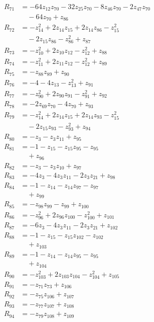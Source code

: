 \begin{align*}
R_{71} &= -64z_{12}z_{70} -32z_{25}z_{70} -8z_{46}z_{70} -2z_{47}z_{70} \\
&\quad -64z_{70} +z_{86} \\
R_{72} &= -z_{14}^{2} +2z_{14}z_{15} +2z_{14}z_{86} -z_{15}^{2} \\
&\quad -2z_{15}z_{86} -z_{86}^{2} +z_{87} \\
R_{73} &= -z_{10}^{2} +2z_{10}z_{12} -z_{12}^{2} +z_{88} \\
R_{74} &= -z_{11}^{2} +2z_{11}z_{12} -z_{12}^{2} +z_{89} \\
R_{75} &= -z_{88}z_{89} +z_{90} \\
R_{76} &= -4 -4z_{13} -z_{13}^{2} +z_{91} \\
R_{77} &= -z_{90}^{2} +2z_{90}z_{91} -z_{91}^{2} +z_{92} \\
R_{78} &= -2z_{69}z_{70} -4z_{70} +z_{93} \\
R_{79} &= -z_{14}^{2} +2z_{14}z_{15} +2z_{14}z_{93} -z_{15}^{2} \\
&\quad -2z_{15}z_{93} -z_{93}^{2} +z_{94} \\
R_{80} &= -z_{3} -z_{3}z_{11} +z_{95} \\
R_{81} &= -1 -z_{15} -z_{15}z_{95} -z_{95} \\
&\quad +z_{96} \\
R_{82} &= -z_{3} -z_{3}z_{10} +z_{97} \\
R_{83} &= -4z_{3} -4z_{3}z_{11} -2z_{3}z_{21} +z_{98} \\
R_{84} &= -1 -z_{14} -z_{14}z_{97} -z_{97} \\
&\quad +z_{99} \\
R_{85} &= -z_{98}z_{99} -z_{99} +z_{100} \\
R_{86} &= -z_{96}^{2} +2z_{96}z_{100} -z_{100}^{2} +z_{101} \\
R_{87} &= -6z_{3} -4z_{3}z_{11} -2z_{3}z_{21} +z_{102} \\
R_{88} &= -1 -z_{15} -z_{15}z_{102} -z_{102} \\
&\quad +z_{103} \\
R_{89} &= -1 -z_{14} -z_{14}z_{95} -z_{95} \\
&\quad +z_{104} \\
R_{90} &= -z_{103}^{2} +2z_{103}z_{104} -z_{104}^{2} +z_{105} \\
R_{91} &= -z_{71}z_{73} +z_{106} \\
R_{92} &= -z_{75}z_{106} +z_{107} \\
R_{93} &= -z_{77}z_{107} +z_{108} \\
R_{94} &= -z_{79}z_{108} +z_{109} \\

\end{align*}
